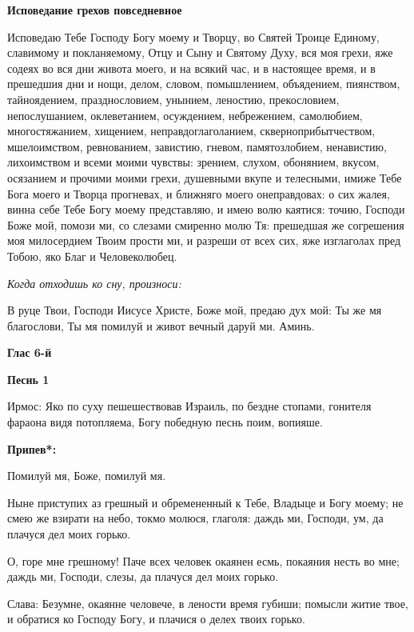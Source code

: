 \medskip
\bfseries Исповедание грехов повседневное\normalfont{}


Исповедаю Тебе Господу Богу моему и Творцу, во Святей Троице Единому, славимому и покланяемому, Отцу и Сыну и Святому Духу, вся моя грехи, яже содеях во вся дни живота моего, и на всякий час, и в настоящее время, и в прешедшия дни и нощи, делом, словом, помышлением, объядением, пиянством, тайноядением, празднословием, унынием, леностию, прекословием, непослушанием, оклеветанием, осуждением, небрежением, самолюбием, многостяжанием, хищением, неправдоглаголанием, скверноприбытчеством, мшелоимством, ревнованием, завистию, гневом, памятозлобием, ненавистию, лихоимством и всеми моими чувствы: зрением, слухом, обонянием, вкусом, осязанием и прочими моими грехи, душевными вкупе и телесными, имиже Тебе Бога моего и Творца прогневах, и ближняго моего онеправдовах: о сих жалея, винна себе Тебе Богу моему представляю, и имею волю каятися: точию, Господи Боже мой, помози ми, со слезами смиренно молю Тя: прешедшая же согрешения моя милосердием Твоим прости ми, и разреши от всех сих, яже изглаголах пред Тобою, яко Благ и Человеколюбец.




\medskip
\itshape Когда отходишь ко сну, произноси:\normalfont{}


В руце Твои, Господи Иисусе Христе, Боже мой, предаю дух мой: Ты же мя благослови, Ты мя помилуй и живот вечный даруй ми. Аминь. 


\mychapterending

 
\bfseries Глас 6-й\normalfont{}


\medskip
\bfseries Песнь 1\normalfont{}


  Ирмос: Яко по суху пешешествовав Израиль, по бездне стопами, гонителя фараона видя потопляема, Богу победную песнь поим, вопияше.


\medskip
\bfseries Припев*:\normalfont{} 

Помилуй мя, Боже, помилуй мя.


Ныне приступих аз грешный и обремененный к Тебе, Владыце и Богу моему; не смею же взирати на небо, токмо молюся, глаголя: даждь ми, Господи, ум, да плачуся дел моих горько.


О, горе мне грешному! Паче всех человек окаянен есмь, покаяния несть во мне; даждь ми, Господи, слезы, да плачуся дел моих горько.


Слава: Безумне, окаянне человече, в лености время губиши; помысли житие твое, и обратися ко Господу Богу, и плачися о делех твоих горько.


